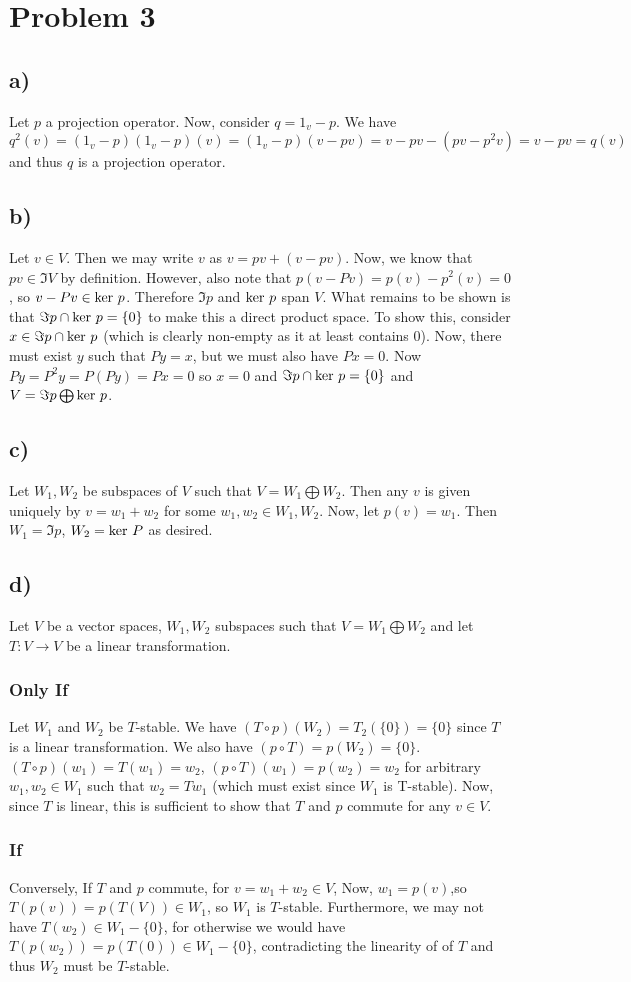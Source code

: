 \section*{Problem 3}
\subsection*{a)}
Let $p$ a projection operator. Now, consider $q=1_v-p$. We have  $q^2(v)=(1_v-p)(1_v-p)(v) = (1_v-p)(v-pv) = v-pv-(pv-p^2v)=v-pv=q(v)$ and thus $q$ is a projection operator.
\subsection*{b)}
Let $v\in V$. Then we may write $v$ as $v=pv+(v-pv)$. Now, we know that $pv\in \Im V$ by definition. However, also note that $p(v-Pv) = p(v)-p^2(v) = 0$, so $v-Pv\in \text{ker } p$. Therefore $\Im p$ and $\text{ker } p$ span $V$. What remains to be shown is that $\Im p \cap \text{ker } p = \{0\}$ to make this a direct product space. To show this, consider $x\in \Im p \cap \text{ker } p$ (which is clearly non-empty as it at least contains $0$). Now, there must exist $y$ such that $Py=x$, but we must also have $Px=0$. Now $Py=P^2 y=P(Py) = Px = 0$ so $x=0$ and $\Im p \cap \text{ker } p = \{0\}$ and $V=\Im p \bigoplus \text{ker } p$.
\subsection*{c)}
Let $W_1, W_2$ be subspaces of $V$ such that $V=W_1\bigoplus  W_2$. Then any $v$ is given uniquely by $v=w_1+w_2$ for some $w_1,w_2 \in W_1,W_2$. Now, let $p(v) = w_1$. Then $W_1=\Im p$, $W_2=\text{ker } P$ as desired. 
\subsection*{d)}
Let $V$ be a vector spaces, $W_1, W_2$ subspaces such that $V=W_1\bigoplus  W_2$ and let $T: V\to V$ be a linear transformation. 
\subsubsection*{Only If}
Let $W_1$ and $W_2$ be $T$-stable. We have $(T\circ p)(W_2) = T_2(\{0\})=\{0\}$ since $T$ is a linear transformation. We also have $(p\circ T)=p(W_2)=\{0\}$. $(T\circ p)(w_1)=T(w_1)=w_2$, $(p\circ T)(w_1)=p(w_2) = w_2$ for arbitrary $w_1,w_2\in W_1$ such that $w_2=Tw_1$ (which must exist since $W_1$ is T-stable). Now, since $T$ is linear, this is sufficient to show that $T$ and $p$ commute for any $v\in V$. 
\subsubsection*{If}
Conversely, If $T$ and $p$ commute, for $v=w_1+w_2\in V$, Now, $w_1 = p(v)$,so $T(p(v)) = p(T(V))\in W_1$, so $W_1$ is $T$-stable. Furthermore, we may not have $T(w_2)\in W_1-\{0\}$, for otherwise we would have $T(p(w_2))=p(T({0}))\in W_1-\{0\}$, contradicting the linearity of of $T$ and thus $W_2$ must be $T$-stable.
